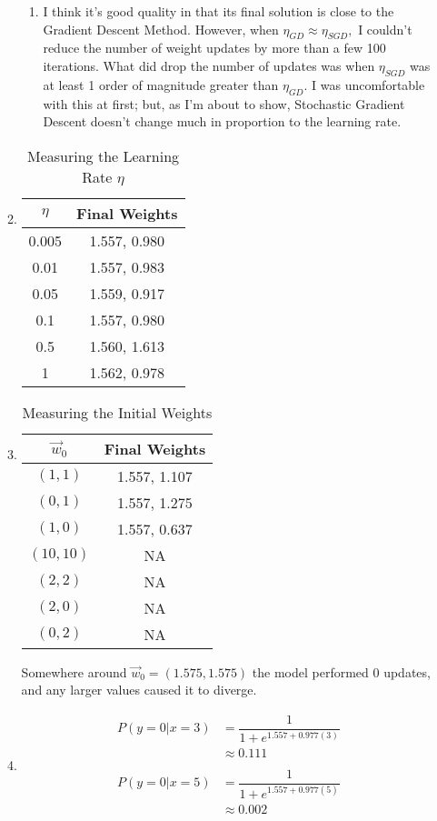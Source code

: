 \documentclass[11pt,letterpaper,oneside]{article}
\numberwithin{equation}{section}
\numberwithin{figure}{section}
\theoremstyle{definition}
\numberwithin{theorem}{section}
\begin{document}
\begin{enumerate}
\begin{enumerate}
\begin{enumerate}
\item I think it's good quality in that its final solution is close to the Gradient Descent Method. However, when $\eta_{GD}\approx\eta_{SGD}, $ I couldn't reduce the number of weight updates by more than a few 100 iterations. What did drop the number of updates was when $\eta_{SGD}$ was at least 1 order of magnitude greater than $\eta_{GD}.$ I was uncomfortable with this at first; but, as I'm about to show, Stochastic Gradient Descent doesn't change much in proportion to the learning rate.
\end{enumerate}
\item
\begin{table}[h]
\caption{Measuring the Learning Rate $\eta$}
\begin{center}
\begin{tabular}{|c|c|}
\firsthline
$\eta$&Final Weights\\\hline
0.005&1.557, 0.980\\\hline
0.01&1.557, 0.983\\\hline
0.05&1.559, 0.917\\\hline
0.1&1.557, 0.980\\\hline
0.5&1.560, 1.613\\\hline
1&1.562, 0.978\\\hline
\end{tabular}
\end{center}
\end{table}%
\item
\begin{table}[h]
\caption{Measuring the Initial Weights}
\begin{center}
\begin{tabular}{|c|c|}\firsthline
$\overrightarrow{w}_0$&Final Weights\\\hline
$(1,1)$&1.557, 1.107\\\hline
$(0,1)$&1.557, 1.275\\\hline
$(1,0)$&1.557, 0.637\\\hline
$(10,10)$&NA\\\hline
$(2,2)$&NA\\\hline
$(2,0)$&NA\\\hline
$(0,2)$&NA\\\hline
\end{tabular}
\end{center}
\label{default}
\end{table}%
Somewhere around $\overrightarrow{w}_0=(1.575,1.575)$ the model performed 0 updates, and any larger values caused it to diverge.
\item
\begin{align*}
P(y=0|x=3)&=\dfrac{1}{1+e^{1.557+0.977(3)}}\\
&\approx 0.111\\\\
P(y=0|x=5)&=\dfrac{1}{1+e^{1.557+0.977(5)}}\\
&\approx 0.002\\
\end{align*}


\end{enumerate}
\end{enumerate}
\end{document}
